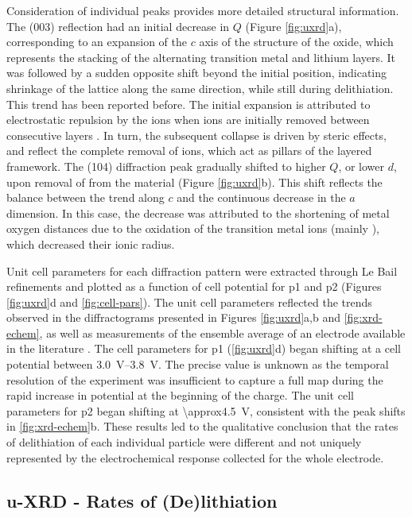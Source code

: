 \documentclass{article}
\begin{document}
Consideration of individual peaks provides more detailed structural
information. The (003) reflection had an initial decrease in $Q$
(Figure \ref{fig:uxrd}a), corresponding to an expansion of the $c$
axis of the structure of the oxide, which represents the stacking of
the alternating transition metal and lithium layers. It was followed
by a sudden opposite shift beyond the initial position, indicating
shrinkage of the lattice along the same direction, while still during
delithiation. This trend has been reported before. The initial
expansion is attributed to electrostatic repulsion by the 
ions when  ions are initially removed between consecutive
layers \cite{Robert2015}. In turn, the subsequent collapse is driven
by steric effects, and reflect the complete removal of  ions,
which act as pillars of the layered framework. The (104) diffraction
peak gradually shifted to higher $Q$, or lower $d$, upon removal of
 from the material (Figure \ref{fig:uxrd}b). This shift
reflects the balance between the trend along $c$ and the continuous
decrease in the $a$ dimension. In this case, the decrease was
attributed to the shortening of metal oxygen distances due to the
oxidation of the transition metal ions (mainly ), which
decreased their ionic radius.

Unit cell parameters for each diffraction pattern were extracted
through Le Bail refinements and plotted as a function of cell
potential for \gls{p1} and \gls{p2} (Figures \ref{fig:uxrd}d and
\ref{fig:cell-pars}). The unit cell parameters reflected the trends
observed in the diffractograms presented in Figures \ref{fig:uxrd}a,b
and \ref{fig:xrd-echem}, as well as measurements of the ensemble
average of an electrode available in the literature
\cite{Robert2015a}. The cell parameters for \gls{p1} (\ref{fig:uxrd}d)
began shifting at a cell potential between
\SIrange{3.0}{3.8}{\volt}. The precise value is unknown as the
temporal resolution of the experiment was insufficient to capture a
full map during the rapid increase in potential at the beginning of
the charge. The unit cell parameters for \gls{p2} began shifting at
\SI{\approx4.5}{\volt}, consistent with the peak shifts in
\ref{fig:xrd-echem}b. These results led to the qualitative conclusion
that the rates of delithiation of each individual particle were
different and not uniquely represented by the electrochemical response
collected for the whole electrode.

\subsection{u-XRD - Rates of (De)lithiation}
\end{document}
